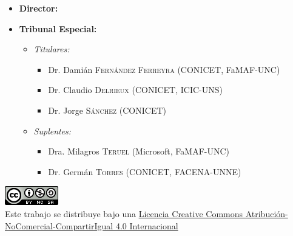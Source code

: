 \documentclass[
11pt, %
spanish, %
singlespacing, %
toctotoc, %
headsepline, %
chapterinoneline, %
]{MastersDoctoralThesis} %
\begin{document}
\begin{titlepage}
\begin{center}
    \begin{itemize}[label={}]
        \item \textbf{Director:} {\normalsize \supname}
        \item \textbf{Tribunal Especial:}
        \normalsize
        \begin{itemize}[label={}]
            \item \emph{Titulares:}
            \begin{itemize}[label={}]
                \item Dr. Damián \textsc{Fernández Ferreyra} (CONICET, FaMAF-UNC)
                \item Dr. Claudio \textsc{Delrieux} (CONICET, ICIC-UNS)
                \item Dr. Jorge \textsc{Sánchez} (CONICET)
            \end{itemize}
            \item \emph{Suplentes:}
            \begin{itemize}[label={}]
                \item Dra. Milagros \textsc{Teruel} (Microsoft, FaMAF-UNC)
                \item Dr. Germán \textsc{Torres} (CONICET, FACENA-UNNE)
            \end{itemize}
        \end{itemize}
    \end{itemize}
    \vspace{1cm}

    \includegraphics{logo_cc_by_nc_sa.png} \\

    \small
    Este trabajo se distribuye bajo una \href{http://creativecommons.org/licenses/by-nc-sa/4.0/}{Licencia Creative Commons Atribución-NoComercial-CompartirIgual 4.0 Internacional}

\end{center}
\end{titlepage}

\end{document}
